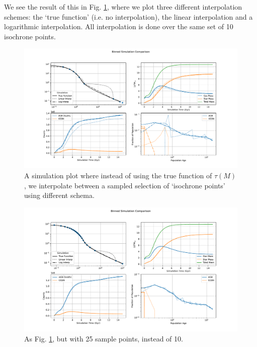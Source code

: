 \documentclass[a4paper,11pt]{article}
\begin{document}
		We see the result of this in Fig. \ref{F:InterpModel}, where we plot three different interpolation schemes: the `true function' (i.e. no interpolation), the linear interpolation and a logarithmic interpolation. All interpolation is done over the same set of 10 isochrone points.
		\begin{figure}
			\begin{center}
			\includegraphics[width=\linewidth,height=0.4\paperheight,keepaspectratio=true]{InterpModel_LowRes.pdf}
			\caption{A simulation plot where instead of using the true function of $\tau(M)$, we interpolate between a sampled selection of `isochrone points' using different schema.}\label{F:InterpModel}
			\end{center}
		\end{figure}
		\begin{figure}
			\begin{center}
			\includegraphics[width=\linewidth,height=0.4\paperheight,keepaspectratio=true]{InterpModel_HighRes.pdf}
			\caption{As Fig. \ref{F:InterpModel}, but with 25 sample points, instead of 10.}\label{F:InterpModel_HighRes}
			\end{center}
		\end{figure}
\end{document}

